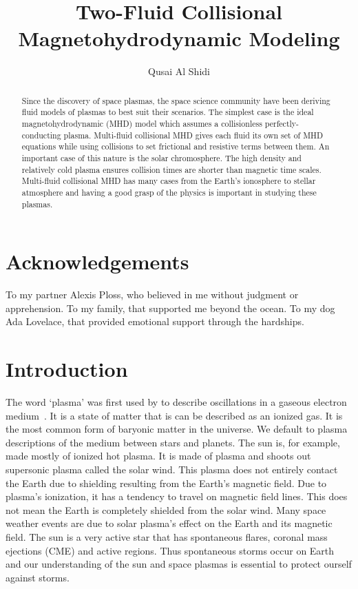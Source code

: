\documentclass[12pt,upcase]{umlthesis}
\begin{document}
\title{Two-Fluid Collisional Magnetohydrodynamic Modeling}
\author{Qusai Al Shidi}
\maketitle

\begin{abstract}
	Since the discovery of space plasmas, the space science community have been deriving fluid models of plasmas to best suit their scenarios. The simplest case is the ideal magnetohydrodynamic (MHD) model which assumes a collisionless perfectly-conducting plasma. Multi-fluid collisional MHD gives each fluid its own set of MHD equations while using collisions to set frictional and resistive terms between them. An important case of this nature is the solar chromosphere. The high density and relatively cold plasma ensures collision times are shorter than magnetic time scales. Multi-fluid collisional MHD has many cases from the Earth's ionosphere to stellar atmosphere and having a good grasp of the physics is important in studying these plasmas.
\end{abstract}
\chapter*{Acknowledgements}
To my partner Alexis Ploss, who believed in me without judgment or apprehension. To my family, that supported me beyond the ocean. To my dog Ada Lovelace, that provided emotional support through the hardships.


\tableofcontents
\listoffigures
\listoftables

\chapter{Introduction}

The word `plasma' was first used by \citet{Langmuir1928} to describe oscillations in a gaseous electron medium~\citep{Tonks1967}. It is a state of matter that is can be described as an ionized gas. It is the most common form of baryonic matter in the universe. We default to plasma descriptions of the medium between stars and planets. The sun is, for example, made mostly of ionized hot plasma. It is made of plasma and shoots out supersonic plasma called the solar wind. This plasma does not entirely contact the Earth due to shielding resulting from the Earth's magnetic field. Due to plasma's ionization, it has a tendency to travel on magnetic field lines. This does not mean the Earth is completely shielded from the solar wind. Many space weather events are due to solar plasma's effect on the Earth and its magnetic field. The sun is a very active star that has spontaneous flares, coronal mass ejections (CME) and active regions. Thus spontaneous storms occur on Earth and our understanding of the sun and space plasmas is essential to protect ourself against storms.
\end{document}
